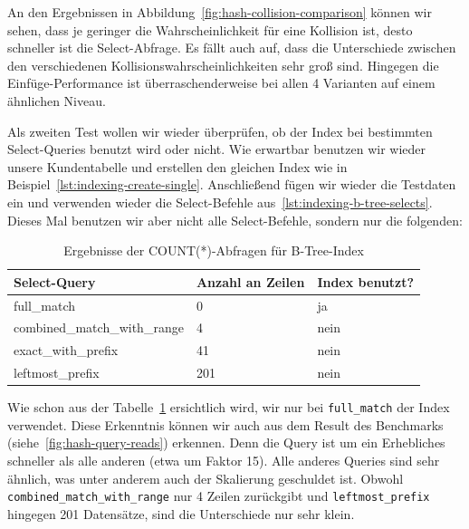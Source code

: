 An den Ergebnissen in Abbildung~\ref{fig:hash-collision-comparison} können wir sehen, dass je geringer die Wahrscheinlichkeit für eine Kollision ist, desto schneller ist die Select-Abfrage.
Es fällt auch auf, dass die Unterschiede zwischen den verschiedenen Kollisionswahrscheinlichkeiten sehr groß sind.
Hingegen die Einfüge-Performance ist überraschenderweise bei allen 4 Varianten auf einem ähnlichen Niveau.

Als zweiten Test wollen wir wieder überprüfen, ob der Index bei bestimmten Select-Queries benutzt wird oder nicht.
Wie erwartbar benutzen wir wieder unsere Kundentabelle und erstellen den gleichen Index wie in Beispiel~\ref{lst:indexing-create-single}.
Anschließend fügen wir wieder die Testdaten ein und verwenden wieder die Select-Befehle aus~\ref{lst:indexing-b-tree-selects}.
Dieses Mal benutzen wir aber nicht alle Select-Befehle, sondern nur die folgenden:

\begin{table}[H]
    \centering
    \begin{tabular}{|l|l|l|}
        \hline
        \textbf{Select-Query} & \textbf{Anzahl an Zeilen} & \textbf{Index benutzt?} \\
        \hline
        full\_match & 0 & ja \\
        combined\_match\_with\_range & 4 & nein \\
        exact\_with\_prefix & 41 & nein \\
        leftmost\_prefix & 201 & nein \\
        \hline
    \end{tabular}
    \caption{Ergebnisse der COUNT(*)-Abfragen für B-Tree-Index}
    \label{tab:indexing_hash_count_results}
\end{table}
\vspace{-15pt}

Wie schon aus der Tabelle~\ref{tab:indexing_hash_count_results} ersichtlich wird, wir nur bei \texttt{full\_match} der Index verwendet.
Diese Erkenntnis können wir auch aus dem Result des Benchmarks (siehe~\ref{fig:hash-query-reads}) erkennen.
Denn die Query ist um ein Erhebliches schneller als alle anderen (etwa um Faktor 15).
Alle anderes Queries sind sehr ähnlich, was unter anderem auch der Skalierung geschuldet ist.
Obwohl \texttt{combined\_match\_with\_range} nur 4 Zeilen zurückgibt und \texttt{leftmost\_prefix} hingegen 201 Datensätze, sind die Unterschiede nur sehr klein.

